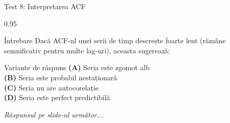 \documentclass[9pt, aspectratio=169, t]{beamer}
\begin{document}
\begin{frame}{Test 8: Interpretarea ACF}
    \begin{cminipage}{0.95\textwidth}
    \begin{alertblock}{Întrebare}
        Dacă ACF-ul unei serii de timp descrește foarte lent (rămâne semnificativ pentru multe lag-uri), aceasta sugerează:
    \end{alertblock}

    \vspace{0.4cm}

    \begin{block}{Variante de răspuns}
    \textcolor{MainBlue}{\textbf{(A)}} Seria este zgomot alb\\[3pt]
    \textcolor{MainBlue}{\textbf{(B)}} Seria este probabil nestaționară\\[3pt]
    \textcolor{MainBlue}{\textbf{(C)}} Seria nu are autocorelație\\[3pt]
    \textcolor{MainBlue}{\textbf{(D)}} Seria este perfect predictibilă
    \end{block}
    \vspace{0.5cm}

    \begin{center}
        \textit{Răspunsul pe slide-ul următor...}
    \end{center}
    \end{cminipage}
\end{frame}
\end{document}

